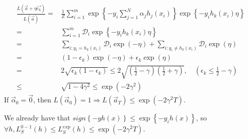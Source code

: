 \begin{align*}
    \frac{L( \vec{a} + \eta \vec{e_k} )}{L( \vec{a} )} =& \frac{1}{Z}  
    \sum^{m}_{i=1} \exp \left\{ - y_i \sum^{N}_{j=1} \alpha_j h_j(x_i)\right\} \exp \left\{- y_i h_k(x_i)\eta \right\} \\
    =& \sum^{m}_{i=1} \mathcal{D}_i \exp \left\{- y_i h_k(x_i)\eta \right\} \\
    =& \sum^{}_{i: y_i = h_k(x_i)} \mathcal{D}_i \exp (- \eta )
          +\sum^{}_{i: y_i \ne h_k(x_i)} \mathcal{D}_i \exp (\eta) \\
    =& ( 1 - \epsilon_k) \exp(-\eta) + \epsilon_k \exp(\eta) \\
    =& 2 \sqrt{\epsilon_{k} (1 - \epsilon_k)} \le 2 \sqrt{\left( \frac{1}{2} - \gamma\right)\left( \frac{1}{2} + \gamma\right)}, \quad ( \epsilon_k \le \frac{1}{2} - \gamma )\\
    \le& \sqrt{1 - 4\gamma^2} \le \exp(- 2 \gamma^2)
\end{align*}
If $ \vec{\alpha}_0 = \vec{0} $, then $ L( \vec{\alpha}_0) = 1 \Rightarrow L( \vec{a}_T ) \le \exp(-2\gamma^2 T) $. 

We already have that $ sign \left\{ -y h(x) \right\} \le \exp \left\{ -y_i h(x) \right\}$, so
$ \forall h, L^{0-1}_S(h) \le L^{e x p}_S(h) \le \exp (-2 \gamma^2 T) $.
